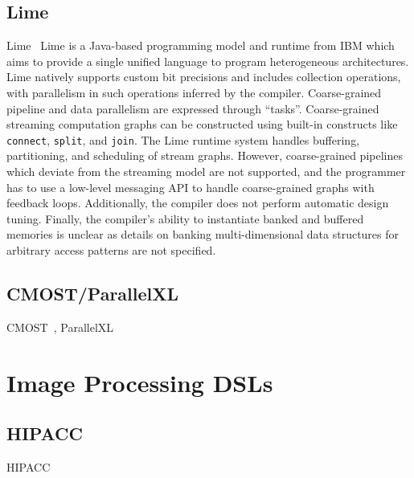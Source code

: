 \subsection{Lime}
Lime~\cite{lime}
%
Lime is a Java-based programming model and runtime from IBM which aims to provide a single unified language to program heterogeneous architectures. Lime natively supports custom bit precisions and includes collection operations, with parallelism in such operations inferred by the compiler. Coarse-grained pipeline and data parallelism are expressed through ``tasks''. Coarse-grained streaming computation graphs can be constructed using built-in constructs like \texttt{\small{connect}}, \texttt{\small{split}}, and \texttt{\small{join}}. The Lime runtime system handles buffering, partitioning, and scheduling of stream graphs. However, coarse-grained pipelines which deviate from the streaming model are not supported, and the programmer has to use a low-level messaging API to handle coarse-grained graphs with feedback loops. Additionally, the compiler does not perform automatic design tuning. Finally, the compiler's ability to instantiate banked and buffered memories is unclear as details on banking multi-dimensional data structures for arbitrary access patterns are not specified.

\subsection{CMOST/ParallelXL}
CMOST~\cite{zhang_DAC_2015_cmost}, ParallelXL~\cite{chen_micro_2018_parallelXL}



\section{Image Processing DSLs}

\subsection{HIPACC}
HIPACC~\cite{membarth_2016_hipa}
%

